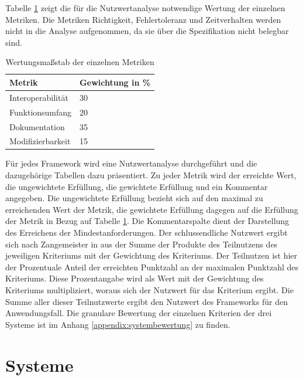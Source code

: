 Tabelle \ref{table:Wertungsmassstab} zeigt die für die Nutzwertanalyse notwendige Wertung der einzelnen Metriken.
Die Metriken Richtigkeit, Fehlertoleranz und Zeitverhalten werden nicht in die Analyse aufgenommen, da sie über die Spezifikation nicht belegbar sind.
\begin{table}[h!]
\centering
\begin{tabular}{l|l}
\textbf{Metrik} & \textbf{Gewichtung in \%} \\ \hline
Interoperabilität & 30 \\ \hline
Funktionsumfang & 20 \\ \hline
Dokumentation & 35 \\ \hline
Modifizierbarkeit & 15
\end{tabular}
\caption{Wertungsmaßstab der einzelnen Metriken}
\label{table:Wertungsmassstab}
\end{table}

Für jedes Framework wird eine Nutzwertanalyse durchgeführt und die dazugehörige Tabellen dazu präsentiert.
Zu jeder Metrik wird der erreichte Wert, die ungewichtete Erfüllung, die gewichtete Erfüllung und ein Kommentar angegeben.
Die ungewichtete Erfüllung bezieht sich auf den maximal zu erreichenden Wert der Metrik, die gewichtete Erfüllung dagegen auf die Erfüllung der Metrik in Bezug auf Tabelle \ref{table:Wertungsmassstab}.
Die Kommentarspalte dient der Darstellung des Erreichens der Mindestanforderungen.
Der schlussendliche Nutzwert ergibt sich nach Zangemeister in \cite{website:nutzwertanalyse} aus der Summe der Produkte des Teilnutzens des jeweiligen Kriteriums mit der Gewichtung des Kriteriums.
Der Teilnutzen ist hier der Prozentuale Anteil der erreichten Punktzahl an der maximalen Punktzahl des Kriteriums.
Diese Prozentangabe wird als Wert mit der Gewichtung des Kriteriums multipliziert, woraus sich der Nutzwert für das Kriterium ergibt.
Die Summe aller dieser Teilnutzwerte ergibt den Nutzwert des Frameworks für den Anwendungsfall.
Die granulare Bewertung der einzelnen Kriterien der drei Systeme ist im Anhang \ref{appendix:systembewertung} zu finden.

\section{Systeme}

